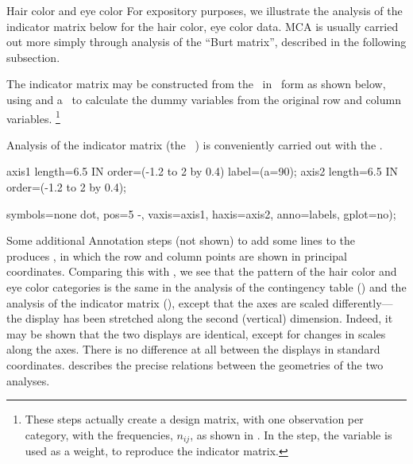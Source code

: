 \begin{Example}[haireye4]{Hair color and eye color}
For expository purposes,
we illustrate the analysis of the indicator matrix below for the hair color,
eye color data.
MCA is usually carried out more simply through analysis of
the ``Burt matrix'', described in the following subsection.

The indicator matrix may be constructed from the \Dset\ in \ctab\ form
as shown below, using  and a \Dstp\ to calculate
the dummy variables from the original row and column variables.%
\footnote{These steps actually create a design matrix, with one
observation per category, with the frequencies, $n_{ij}$, as shown in
.  In the  step, the
 variable is used as a weight, to reproduce the
indicator matrix.}


Analysis of the indicator matrix (the \Dset\ )
is conveniently carried out with the .
\begin{listing}
axis1 length=6.5 IN order=(-1.2 to 2 by 0.4) label=(a=90);
axis2 length=6.5 IN order=(-1.2 to 2 by 0.4);

   symbols=none dot, pos=5 -, vaxis=axis1, haxis=axis2, anno=labels, gplot=no);
\end{listing}

Some additional Annotation steps (not shown) to add some lines to
the \ADS\  produces ,
in which the row and column points are shown in principal coordinates.
Comparing this with , we see that the pattern of
the hair color and eye color categories is the same in the analysis of
the contingency table () and the analysis of the
indicator matrix (), except that the axes are scaled
differently---the display has been stretched along the second (vertical)
dimension.
Indeed, it may be shown \citep{Greenacre:84}
that the two displays are identical, except for changes in scales along
the axes.
There is no difference at all between the displays in standard coordinates.
\citet[pp. 130--134]{Greenacre:84} describes the precise relations
between the geometries of the two analyses.


\end{Example}
